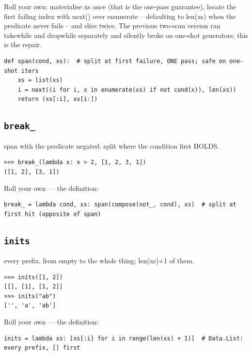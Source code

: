\documentclass[10pt,letterpaper]{book}
\begin{document}
Roll your own: materialise xs once (that is the one-pass guarantee), locate the first failing index with next() over enumerate -- defaulting to len(xs) when the predicate never fails -- and slice twice. The previous two-scan version ran takewhile and dropwhile separately and silently broke on one-shot generators; this is the repair.

\begin{lstlisting}[style=ex]
def span(cond, xs):  # split at first failure, ONE pass; safe on one-shot iters
    xs = list(xs)
    i = next((i for i, x in enumerate(xs) if not cond(x)), len(xs))
    return (xs[:i], xs[i:])
\end{lstlisting}

\subsection{\texttt{break\_}}\label{def:break-}
span with the predicate negated: split where the condition first HOLDS.
\begin{lstlisting}[style=ex]
>>> break_(lambda x: x > 2, [1, 2, 3, 1])
([1, 2], [3, 1])
\end{lstlisting}

Roll your own --- the definition:

\begin{lstlisting}[style=ex]
break_ = lambda cond, xs: span(compose(not_, cond), xs)  # split at first hit (opposite of span)
\end{lstlisting}

\subsection{\texttt{inits}}\label{def:inits}
every prefix, from empty to the whole thing; len(xs)+1 of them.
\begin{lstlisting}[style=ex]
>>> inits([1, 2])
[[], [1], [1, 2]]
>>> inits("ab")
['', 'a', 'ab']
\end{lstlisting}

Roll your own --- the definition:

\begin{lstlisting}[style=ex]
inits = lambda xs: [xs[:i] for i in range(len(xs) + 1)]  # Data.List: every prefix, [] first
\end{lstlisting}
\end{document}
